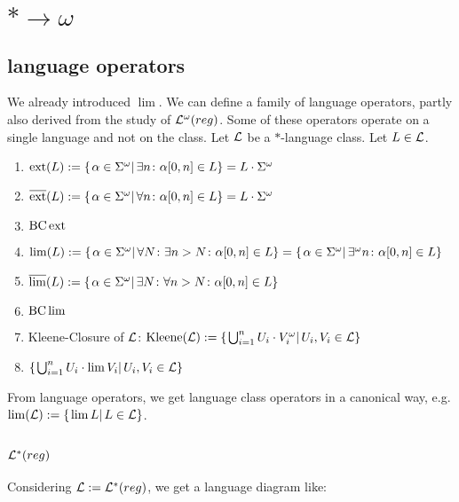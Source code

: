 \section{$* \rightarrow \omega$}

\subsection{ language operators}

We already introduced $\lim$. We can define a family of language operators, partly also derived from the study of $\mathcal{L}^\omega(reg)$. Some of these operators operate on a single language and not on the class. Let $\mathcal{L}$ be a $*$-language class. Let $L \in \mathcal{L}$.

\begin{enumerate}
\item $\ext(L) := \Set{\alpha \in \Sigma^\omega}{ \exists n \colon \alpha[0,n] \in L} = L \cdot \Sigma^\omega$
\item $\dext(L) := \Set{\alpha \in \Sigma^\omega}{ \forall n \colon \alpha[0,n] \in L} = L \cdot \Sigma^\omega$
\item $\operatorname{BC} \operatorname{ext}$
\item $\lim(L) := \Set{ \alpha \in \Sigma^\omega }{ \forall N \colon \exists n > N \colon \alpha[0,n] \in L } = \Set{ \alpha \in \Sigma^\omega }{ \exists^\omega n \colon \alpha[0,n] \in L }$
\item $\dlim(L) := \Set{ \alpha \in \Sigma^\omega }{ \exists N \colon \forall n > N \colon \alpha[0,n] \in L }$
\item $\operatorname{BC} \lim$
\item Kleene-Closure of $\mathcal{L}$: $\Kleene(\Lang) := \Set{ \bigcup_{i=1}^n U_i \cdot V_i^\omega}{U_i, V_i \in \Lang}$
\item $\Set{\bigcup_{i=1}^n U_i \cdot \lim V_i}{U_i, V_i \in \Lang}$
\end{enumerate}

From language operators, we get language class operators in a canonical way, e.g. $\lim(\Lang) := \Set{\lim L}{L \in \Lang}$.

\subsection{$\mathcal{L}^*(reg)$}

Considering $\mathcal{L} := \mathcal{L}^*(reg)$, we get a language diagram like:


